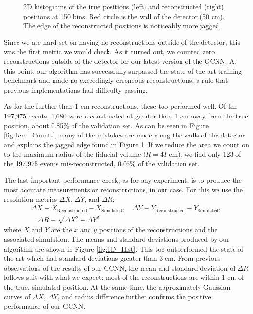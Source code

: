 \documentclass[thesis.tex]{subfiles}
\begin{document}
\begin{figure}[t]
\begin{subfigure}[b]{0.45\textwidth}
	\end{subfigure}
	\caption{
	2D histograms of the true positions (left) and reconstructed (right) positions at 150 bins.
	Red circle is the wall of the detector (50 cm).
	The edge of the reconstructed positions is noticeably more jagged.
	}
	\label{fig:2D_Hists}
\end{figure}
\par Since we are hard set on having no reconstructions outside of the detector, this was the first metric we would check.
As it turned out, we counted zero reconstructions outside of the detector for our latest version of the GCNN.
At this point, our algorithm has successfully surpassed the state-of-the-art training benchmark and made no exceedingly erroneous reconstructions, a rule that previous implementations had difficulty passing.
\par As for the further than 1 cm reconstructions, these too performed well.
Of the 197,975 events, 1,680 were reconstructed at greater than 1 cm away from the true position, about 0.85\% of the validation set.
As can be seen in Figure \ref{fig:1cm_Counts}, many of the mistakes are made along the walls of the detector and explains the jagged edge found in Figure \ref{fig:2D_Hists}.
If we reduce the area we count on to the maximum radius of the fiducial volume ($R=43$ cm), we find only 123 of the 197,975 events mis-reconstructed, 0.06\% of the validation set.
\par The last important performance check, as for any experiment, is to produce the most accurate measurements or reconstructions, in our case.
For this we use the resolution metrics $\Delta X$, $\Delta Y$, and $\Delta R$:
\begin{gather*}
	\Delta X \equiv X_\text{Reconstructed} - X_\text{Simulated},
	\quad \Delta Y \equiv Y_\text{Reconstructed} - Y_\text{Simulated}, \\
	\quad \Delta R \equiv \sqrt{ \Delta X^2 + \Delta Y^2 }
\end{gather*}
where $X$ and $Y$ are the $x$ and $y$ positions of the reconstructions and the associated simulation.
The means and standard deviations produced by our algorithm are shown in Figure \ref{fig:1D_Hist}.
This too outperformed the state-of-the-art which had standard deviations greater than 3 cm.
From previous observations of the results of our GCNN, the mean and standard deviation of $\Delta R$ follows suit with what we expect: most of the reconstructions are within 1 cm of the true, simulated position.
At the same time, the approximately-Gaussian curves of $\Delta X$, $\Delta Y$, and radius difference further confirms the positive performance of our GCNN.
\end{document}
